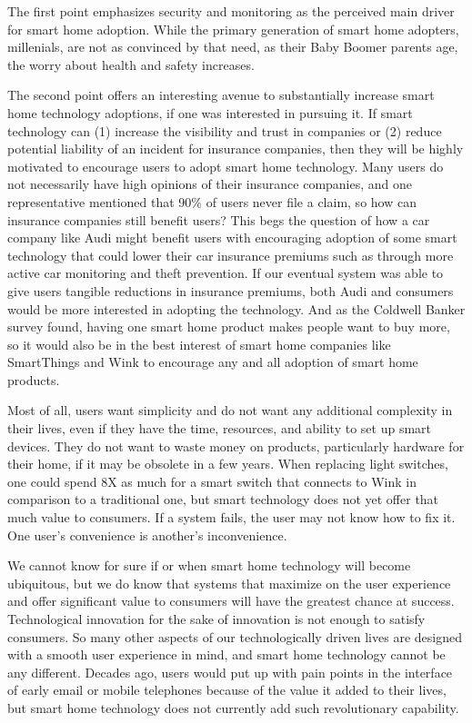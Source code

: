 \noindent
The first point emphasizes security and monitoring as the perceived main driver for smart home adoption. While the primary generation of smart home adopters, millenials, are not as convinced by that need, as their Baby Boomer parents age, the worry about health and safety increases.

The second point offers an interesting avenue to substantially increase smart home technology adoptions, if one was interested in pursuing it. If smart technology can (1) increase the visibility and trust in  companies or (2) reduce potential liability of an incident for insurance companies, then they will be highly motivated to encourage users to adopt smart home technology. Many users do not necessarily have high opinions of their insurance companies, and one representative mentioned that 90\% of users never file a claim, so how can insurance companies still benefit users? This begs the question of how a car company like Audi might benefit users with encouraging adoption of some smart technology that could lower their car insurance premiums such as through more active car monitoring and theft prevention. If our eventual system was able to give users tangible reductions in insurance premiums, both Audi and consumers would be more interested in adopting the technology. And as the Coldwell Banker survey found, having one smart home product makes people want to buy more, so it would also be in the best interest of smart home companies like SmartThings and Wink to encourage any and all adoption of smart home products.

Most of all, users want simplicity and do not want any additional complexity in their lives, even if they have the time, resources, and ability to set up smart devices. They do not want to waste money on products, particularly hardware for their home, if it may be obsolete in a few years. When replacing light switches, one could spend 8X as much for a smart switch that connects to Wink in comparison to a traditional one, but smart technology does not yet offer that much value to consumers. If a system fails, the user may not know how to fix it. One user's convenience is another's inconvenience.

We cannot know for sure if or when smart home technology will become ubiquitous, but we do know that systems that maximize on the user experience and offer significant value to consumers will have the greatest chance at success. Technological innovation for the sake of innovation is not enough to satisfy consumers. So many other aspects of our technologically driven lives are designed with a smooth user experience in mind, and smart home technology cannot be any different. Decades ago, users would put up with pain points in the interface of early email or mobile telephones because of the value it added to their lives, but smart home technology does not currently add such revolutionary capability.

